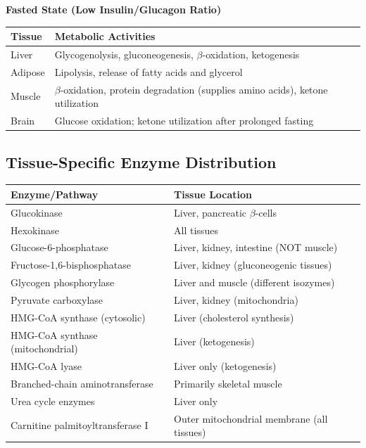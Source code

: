 \vspace{0.5cm}

\begin{center}
\textbf{Fasted State (Low Insulin/Glucagon Ratio)}
\end{center}

\begin{tabular}{p{4cm}p{10cm}}
\toprule
\textbf{Tissue} & \textbf{Metabolic Activities} \\
\midrule
Liver & Glycogenolysis, gluconeogenesis, $\beta$-oxidation, ketogenesis \\
Adipose & Lipolysis, release of fatty acids and glycerol \\
Muscle & $\beta$-oxidation, protein degradation (supplies amino acids), ketone utilization \\
Brain & Glucose oxidation; ketone utilization after prolonged fasting \\
\bottomrule
\end{tabular}

\subsection{Tissue-Specific Enzyme Distribution}

\begin{center}
\begin{tabular}{p{5cm}p{9cm}}
\toprule
\textbf{Enzyme/Pathway} & \textbf{Tissue Location} \\
\midrule
Glucokinase & Liver, pancreatic $\beta$-cells \\
Hexokinase & All tissues \\
Glucose-6-phosphatase & Liver, kidney, intestine (NOT muscle) \\
Fructose-1,6-bisphosphatase & Liver, kidney (gluconeogenic tissues) \\
Glycogen phosphorylase & Liver and muscle (different isozymes) \\
Pyruvate carboxylase & Liver, kidney (mitochondria) \\
HMG-CoA synthase (cytosolic) & Liver (cholesterol synthesis) \\
HMG-CoA synthase (mitochondrial) & Liver (ketogenesis) \\
HMG-CoA lyase & Liver only (ketogenesis) \\
Branched-chain aminotransferase & Primarily skeletal muscle \\
Urea cycle enzymes & Liver only \\
Carnitine palmitoyltransferase I & Outer mitochondrial membrane (all tissues) \\
\bottomrule
\end{tabular}
\end{center}

